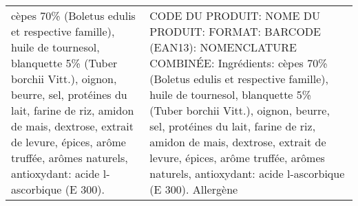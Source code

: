 \begin{tabular}{p{7cm}p{7cm}}
                                                                                                                                                                              cèpes 70\% (Boletus edulis et respective famille), huile de tournesol, blanquette 5\% (Tuber borchii Vitt.), oignon, beurre, sel, protéines du lait, farine de riz, amidon de mais, dextrose, extrait de levure, épices, arôme truffée, arômes naturels, antioxydant: acide l-ascorbique (E 300). &                                                                                                                                                                                                                                                                                                                                                                                                                                                                                                                                                                                                                                                                                                                                                                                                                                                                                                                                                                 CODE DU PRODUIT:  \newline NOME DU PRODUIT:  \newline FORMAT:  \newline BARCODE (EAN13):  \newline NOMENCLATURE COMBINÉE:  \newline   \newline   \newline Ingrédients:  cèpes  70\%  (Boletus  edulis  et  respective  famille),  huile  de  tournesol,    blanquette  5\%  (Tuber  borchii  Vitt.),  \newline oignon,  beurre,  sel,  protéines  du  lait,  farine  de  riz,  amidon  de  mais,  dextrose,  extrait  de  levure,  épices,  arôme  truffée,  \newline arômes naturels, antioxydant: acide l-ascorbique (E 300).  \newline   \newline Allergène   \\

\end{tabular}
